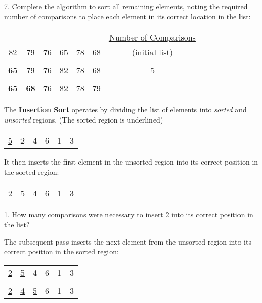 \documentclass[11pt]{article}
\begin{document}
7. Complete the algorithm to sort all remaining elements, noting the required number of comparisons to place each element in its correct location in the list:

\begin{tabular}{c c c c c c c}

& & & & & & \underline{Number of Comparisons} \\

82 & 79 & 76 & 65 & 78 & 68 & (initial list) \\ \\


{\bf 65} & 79 & 76 & 82 & 78 & 68 & 5 \\ \\

{\bf 65} & {\bf 68} & 76 & 82 & 78 & 79 & \\

\end{tabular}

\newpage

The {\bf Insertion Sort} operates by dividing the list of elements into {\it sorted} and {\it unsorted} regions. (The sorted region is underlined)

\begin{tabular}{c c c c c c}

\underline{5} & 2 & 4 & 6 & 1 & 3 \\

\end{tabular}

It then inserts the first element in the unsorted region into its correct position in the sorted region:

\begin{tabular}{c c c c c c}

\underline{2} & \underline{5} & 4 & 6 & 1 & 3 \\

\end{tabular}

1. How many comparisons were necessary to insert 2 into its correct position in the list?

The subsequent pass inserts the next element from the unsorted region into its correct position in the sorted region:

\begin{tabular}{c c c c c c}

\underline{2} & \underline{5} & 4 & 6 & 1 & 3 \\ \\
\underline{2} & \underline{4} & \underline{5} & 6 & 1 & 3 \\


\end{tabular}
\end{document}
